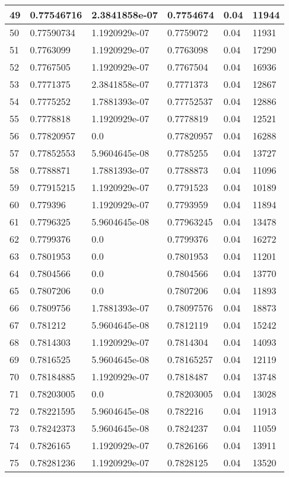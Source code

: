 \begin{longtable}{|l|l|l|l|l|l|}
49 & 0.77546716 & 2.3841858e-07 & 0.7754674 & 0.04 & 11944 \\ \hline 
50 & 0.77590734 & 1.1920929e-07 & 0.7759072 & 0.04 & 11931 \\ \hline 
51 & 0.7763099 & 1.1920929e-07 & 0.7763098 & 0.04 & 17290 \\ \hline 
52 & 0.7767505 & 1.1920929e-07 & 0.7767504 & 0.04 & 16936 \\ \hline 
53 & 0.7771375 & 2.3841858e-07 & 0.7771373 & 0.04 & 12867 \\ \hline 
54 & 0.7775252 & 1.7881393e-07 & 0.77752537 & 0.04 & 12886 \\ \hline 
55 & 0.7778818 & 1.1920929e-07 & 0.7778819 & 0.04 & 12521 \\ \hline 
56 & 0.77820957 & 0.0 & 0.77820957 & 0.04 & 16288 \\ \hline 
57 & 0.77852553 & 5.9604645e-08 & 0.7785255 & 0.04 & 13727 \\ \hline 
58 & 0.7788871 & 1.7881393e-07 & 0.7788873 & 0.04 & 11096 \\ \hline 
59 & 0.77915215 & 1.1920929e-07 & 0.7791523 & 0.04 & 10189 \\ \hline 
60 & 0.779396 & 1.1920929e-07 & 0.7793959 & 0.04 & 11894 \\ \hline 
61 & 0.7796325 & 5.9604645e-08 & 0.77963245 & 0.04 & 13478 \\ \hline 
62 & 0.7799376 & 0.0 & 0.7799376 & 0.04 & 16272 \\ \hline 
63 & 0.7801953 & 0.0 & 0.7801953 & 0.04 & 11201 \\ \hline 
64 & 0.7804566 & 0.0 & 0.7804566 & 0.04 & 13770 \\ \hline 
65 & 0.7807206 & 0.0 & 0.7807206 & 0.04 & 11893 \\ \hline 
66 & 0.7809756 & 1.7881393e-07 & 0.78097576 & 0.04 & 18873 \\ \hline 
67 & 0.781212 & 5.9604645e-08 & 0.7812119 & 0.04 & 15242 \\ \hline 
68 & 0.7814303 & 1.1920929e-07 & 0.7814304 & 0.04 & 14093 \\ \hline 
69 & 0.7816525 & 5.9604645e-08 & 0.78165257 & 0.04 & 12119 \\ \hline 
70 & 0.78184885 & 1.1920929e-07 & 0.7818487 & 0.04 & 13748 \\ \hline 
71 & 0.78203005 & 0.0 & 0.78203005 & 0.04 & 13028 \\ \hline 
72 & 0.78221595 & 5.9604645e-08 & 0.782216 & 0.04 & 11913 \\ \hline 
73 & 0.78242373 & 5.9604645e-08 & 0.7824237 & 0.04 & 11059 \\ \hline 
74 & 0.7826165 & 1.1920929e-07 & 0.7826166 & 0.04 & 13911 \\ \hline 
75 & 0.78281236 & 1.1920929e-07 & 0.7828125 & 0.04 & 13520 \\ \hline 
\end{longtable}